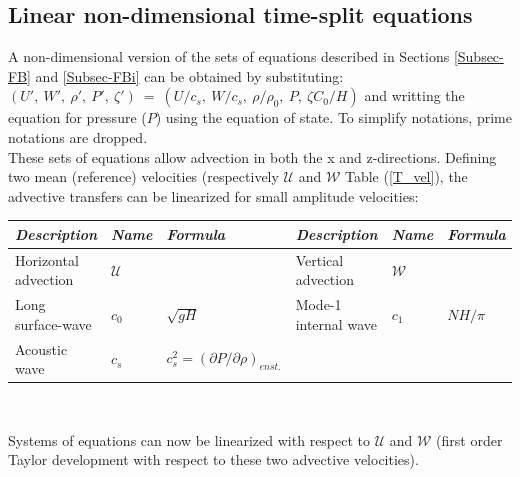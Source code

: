 \documentclass[a4paper,11pt]{article}
\begin{document}
\subsection{Linear non-dimensional time-split equations}
\label{SMadim}

A non-dimensional version of the sets of equations described in Sections \ref{Subsec-FB} and \ref{Subsec-FBi} can be obtained by substituting: $(U',\ W',\ \rho',\ P',\ \zeta')\ =\ (U/c_s,\ W/c_s,\ \rho/\rho_0,\ P,\ \zeta C_0/H)$ and writting the equation for pressure ($P$) using the equation of state. To simplify notations, prime notations are  dropped.\\

These sets of equations allow advection in both the x and z-directions. Defining two mean (reference) velocities (respectively $\mathcal{U}$ and $\mathcal{W}$ Table (\ref{T_vel}), the advective transfers can be linearized for small amplitude velocities:\\

    {\renewcommand{\arraystretch}{2}
    \begin{tabular}{|l|l|l|l|l|l|}
     \hline
     \textit{Description} & \textit{Name} & \textit{Formula} &
     \textit{Description} & \textit{Name} & \textit{Formula} \\
     \hline
     Horizontal advection & $\mathcal{U}$ &  &
     Vertical advection & $\mathcal{W}$  & \\
     Long surface-wave  & $c_0$ & $\sqrt{gH}$  &
     Mode-1 internal wave & $c_1$ & $NH/\pi$  \\ 
     Acoustic wave  &  $c_s$ & $c_s^2= (\partial{P}/\partial{\rho})_{enst.} $&
     & & \\
     \hline
    \end{tabular}}\\

    \label{T_vel} 
    
Systems of equations can now be linearized with respect to $\mathcal{U}$ and $\mathcal{W}$ (first order Taylor development with respect to these two advective velocities).
    
\end{document}
